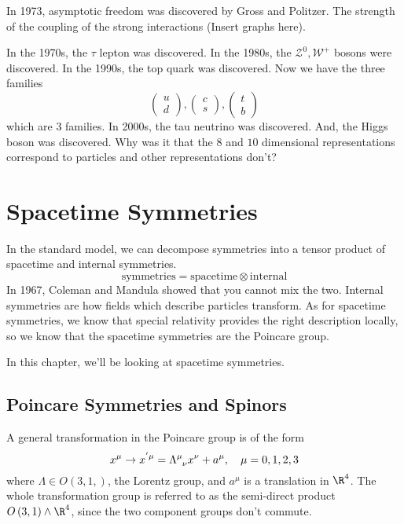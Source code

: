 \documentclass[11pt, oneside]{article}   	%
\theoremstyle{slanted}
\begin{document}
In 1973, asymptotic freedom was discovered 
by Gross and Politzer. 
The strength 
of the coupling of the strong interactions 
(Insert graphs here). 

In the 1970s, the $ \tau $ 
lepton was discovered.
In the 1980s, 
the $ \mathcal{ Z } ^ 0 , \mathcal{ W } ^ + $ 
bosons were discovered. 
In the 1990s, the top quark was discovered. 
Now we have the three families
\[
 \begin{pmatrix} u \\ d  \end{pmatrix}  , 
 \begin{pmatrix}  c \\ s  \end{pmatrix} , 
 \begin{pmatrix}  t \\ b  \end{pmatrix} 
\] which are 3 families. 
In 2000s, the tau neutrino 
was discovered. And, 
the Higgs boson was discovered. 
Why was it that the $ 8 $ and $ 10 $ 
dimensional representations 
correspond to particles and 
other representations don't? 

\section{Spacetime Symmetries} 

In the standard model, 
we can decompose symmetries into a tensor product 
of spacetime and internal symmetries. 
\[
 \text{symmetries} = \text{spacetime} \otimes \text{internal}
\] In 1967, Coleman and Mandula 
showed that you cannot mix the two. 
Internal symmetries are how fields which 
describe particles transform. 
As for spacetime symmetries, 
we know that special relativity provides the right description 
locally, so we know that the spacetime symmetries 
are the Poincare group. 

In this chapter, we'll 
be looking at spacetime symmetries. 

\subsection{Poincare Symmetries and Spinors}
A general transformation 
in the Poincare group is of the form 
\[
 x ^ \mu \to x^{ ' \mu }  = \Lambda \indices{ ^ \mu _ \nu } x ^ \nu + a ^ \mu  , 
 \quad \mu = 0 , 1, 2, 3 
\] where $ \Lambda \in O \left( 3, 1,  \right)  $, 
the Lorentz group, and $ a ^ \mu   $
is a translation in $ \R ^ 4$. 
The whole transformation group is 
referred to as the semi-direct product 
$ O \left( 3, 1  \right)  \wedge  \R ^ 4 $, 
since the two component groups don't
commute. 
\end{document}
